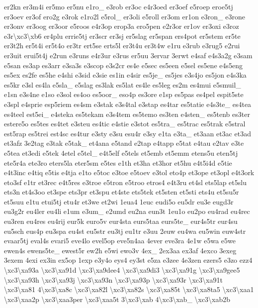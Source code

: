 \begin{DoxyCompactItemize}
er2kn er3m4i er5mo er5nu e1ro\-\_\- e3rob er3oc e4r3oed er3oef e5roep eroe5tj er3oev er3of ero2g e3rok e1ro2l e5rol\-\_\- er3oli e5roll er3om er1on e3ron\-\_\- e3rone er3onv er3oog er3oor e5roos e4r3op erop3a ero5pen e2r3or er1ov er3oxi e3roz e3r\textbackslash{}xc3\textbackslash{}xb6 er4plu errie5tj er3scr er3sj er5slag er5span ers4pot er5stem er5te er3t2h er5t4i er5t4o er3tr ert5se erts5l er3t4u er3t4w e1ru e3rub e3rug5 e2rui er3uit erui5t4j e2run e3runs e4r3ur e3rus er5uu 3ervar 3erwt e4saf e4s3a2g e3sam e5san es3ap es3arr e3sa3s e3scop e3s2cr es4e e5sec es5een e5sel es5ene e4s5eng es5ex es2fe es5he e4shi e3sid e3sie es1in e4sir es5je\-\_\- es5jes e3s4jo es5jon e4s3ka es5kr e3sl es4la e5sla\-\_\- e5slag es3lak es5lat es4le es5leg es2m es4mui e5smuil\-\_\- e1sn e3s4ne e1so e3sol es4oo es5oor\-\_\- eso4p es3ore e1sp es5pas es4pel espit5ste e3spl e4sprie esp5riem es4sm e3stak e3s4tal e3stap es4tar es5tatie e4s3te\-\_\- es4tea es4teel est5ei\-\_\- e4steka es5tekam e3s4tem es5temo es3ten e4sten\-\_\- es5tenb es3ter estere5o es5tes es4tet e3steu es4tic e4stie e3stot es5tra\-\_\- es5trac es5trak e5stral est5rap es5trei est4sc es4tur e3sty e3su esu4r e3sy e1ta e3ta\-\_\- et3aan et3ac et3ad et3afz 3e2tag e3tak e5tak\-\_\- et4ana e5tand e2tap e4tapp e5tat e4tau e2tav e3te e5tea et3edi e5tek 4etel e5tel\-\_\- e4t5elf e5tels et5emb et5emm etens5u eten5tj ete5r4a ete3ro eters5la eter5sm e5tes e1th et3ha et3hor et5hu e4t5i4d e5tie e4t3inc e4tiq e5tis e4tja e1to e5toc e3toe e5toev e3tol eto4p et3ope et3opl e4t3ork eto3sf e1tr et3rec e4t5res e3troe e5tron e5troo etros4 e4t3ru et4sl ets5lap et5slu ets3n et4s3oo et3spe ets3pr et3spu et4ste ets5tek et5sten et5sti ets4u et5su5r et5suu e1tu etui5tj etu4r et3we et2wi 1eua4 1euc eudi5o eu5dr eu3e eugd3r eu3g2r eu4ler eu4li e1um e3um\-\_\- e2umd eu2na eun3t 1eu1o eu2po eu4rad eu4rec eu3ren eu4res eu4rij eur5k euro5v eur4sta eurs5taa eurs5te\-\_\- eur4s5tr eur4su eu5sch eus4p eu3spa eu4st eu5str eu3tj eu1tr e3uu 2euw eu4wa eu5win euw4str evaar5tj eval4s evari5 eve4lo evel5op eve5n4aa 4ever eve3ra 4e1w e5wa e5we ewen4s ewens5te\-\_\- ewest5r ew2h e5wi ewo3v 4ex\-\_\- 2ex3aa ex3af 4exco 3exeg 3exem 4exi ex3in ex5op 1exp e3y4o eys4 ey3st e5za e3zee 4e3zen ezers5 e3zo ezz4 \textbackslash{}xc3\textbackslash{}xa93a \textbackslash{}xc3\textbackslash{}xa91d \textbackslash{}xc3\textbackslash{}xa9dee4 \textbackslash{}xc3\textbackslash{}xa9di3 \textbackslash{}xc3\textbackslash{}xa91g \textbackslash{}xc3\textbackslash{}xa9gee5 \textbackslash{}xc3\textbackslash{}xa93h \textbackslash{}xc3\textbackslash{}xa93j \textbackslash{}xc3\textbackslash{}xa93n \textbackslash{}xc3\textbackslash{}xa93p \textbackslash{}xc3\textbackslash{}xa93r \textbackslash{}xc3\textbackslash{}xa91t \textbackslash{}xc3\textbackslash{}xa81 4\textbackslash{}xc3\textbackslash{}xa8c \textbackslash{}xc3\textbackslash{}xa82l \textbackslash{}xc3\textbackslash{}xa82s \textbackslash{}xc3\textbackslash{}xa85t \textbackslash{}xc3\textbackslash{}xa8ta5 \textbackslash{}xc3\textbackslash{}xaa1 \textbackslash{}xc3\textbackslash{}xaa2p \textbackslash{}xc3\textbackslash{}xaa3per \textbackslash{}xc3\textbackslash{}xaa5t 3\textbackslash{}xc3\textbackslash{}xab 4\textbackslash{}xc3\textbackslash{}xab\-\_\- \textbackslash{}xc3\textbackslash{}xab2b 
\end{DoxyCompactItemize}
